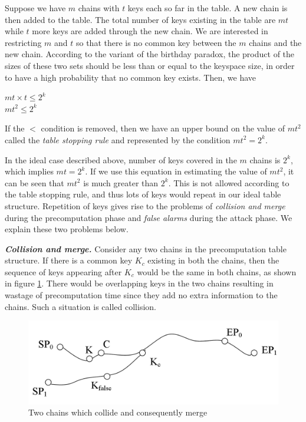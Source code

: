 \begin{enumerate}
Suppose we have $m$ chains with $t$ keys each so far in the table. A new chain is then added to the table. The total number of keys existing in the table are $mt$ while $t$ more keys are added through the new chain. We are interested in restricting $m$ and $t$ so that there is no common key between the $m$ chains and the new chain. According to the variant of the birthday paradox, the product of the sizes of these two sets should be less than or equal to the keyspace size, in order to have a high probability that no common key exists. Then, we have 

\begin{center}
$mt \times t \leq 2^k$\\
$mt^2 \leq 2^k$\\
\end{center}

If the $<$ condition is removed, then we have an upper bound on the value of $mt^2$ called the \emph{table stopping rule} and represented by the condition 
$mt^2 = 2^k$. 

In the ideal case described above, number of keys covered in the $m$ chains is $2^k$, which implies $mt = 2^k$. If we use this equation in estimating the value of $mt^2$, it can be seen that $mt^2$ is much greater than $2^k$. This is not allowed according to the table stopping rule, and thus lots of keys would repeat in our ideal table structure. Repetition of keys gives rise to the problems of \emph{collision and merge} during the precomputation phase and \emph{false alarms} during the attack phase. We explain these two problems below.
\end{enumerate}

\noindent \textit{\textbf{Collision and merge.}} Consider any two chains in the precomputation table structure. If there is a common key $K_c$ existing in both the chains, then the sequence of keys appearing after $K_c$ would be the same in both chains, as shown in figure \ref{fig:collision-merge}. There would be overlapping keys in the two chains resulting in wastage of precomputation time since they add no extra information to the chains. Such a situation is called collision.\\

\begin{figure}[ht!]
	\centering
		\includegraphics[width=4.5in]{./figures/collision-merge.PNG}
	\caption{Two chains which collide and consequently merge}	
	\label{fig:collision-merge}
\end{figure}

